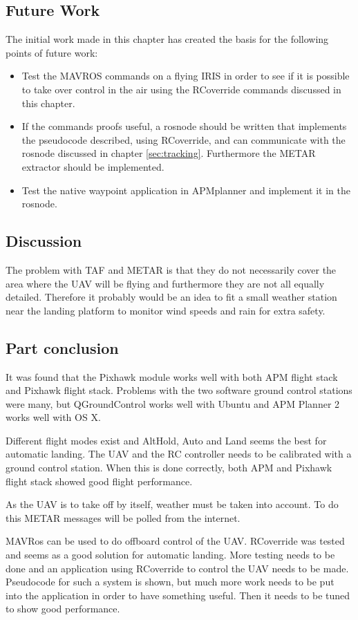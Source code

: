 \subsection{Future Work}
The initial work made in this chapter has created the basis for the following points of future work: 
\begin{itemize}
\item Test the MAVROS commands on a flying IRIS in order to see if it is possible to take over control in the air using the RCoverride commands discussed in this chapter.
\item If the commands proofs useful, a rosnode should be written that implements the pseudocode described, using RCoverride, and can communicate with the rosnode discussed in chapter \ref{sec:tracking}. Furthermore the METAR extractor should be implemented.
\item Test the native waypoint application in APMplanner and implement it in the rosnode.
\end{itemize}
\subsection{Discussion}
The problem with TAF and METAR is that they do not necessarily cover the area where the UAV will be flying and furthermore they are not all equally detailed. Therefore it probably would be an idea to fit a small weather station near the landing platform to monitor wind speeds and rain for extra safety. 
\subsection{Part conclusion}
It was found that the Pixhawk module works well with both APM flight stack and Pixhawk flight stack. Problems with the two software ground control stations were many, but QGroundControl works well with Ubuntu and APM Planner 2 works well with OS X.

Different flight modes exist and AltHold, Auto and Land seems the best for automatic landing. The UAV and the RC controller needs to be calibrated with a ground control station. When this is done correctly, both APM and Pixhawk flight stack showed good flight performance.

As the UAV is to take off by itself, weather must be taken into account. To do this METAR messages will be polled from the internet. 

MAVRos can be used to do offboard control of the UAV. RCoverride was tested and seems as a good solution for automatic landing. More testing needs to be done and an application using RCoverride to control the UAV needs to be made. Pseudocode for such a system is shown, but much more work needs to be put into the application in order to have something useful. Then it needs to be tuned to show good performance.